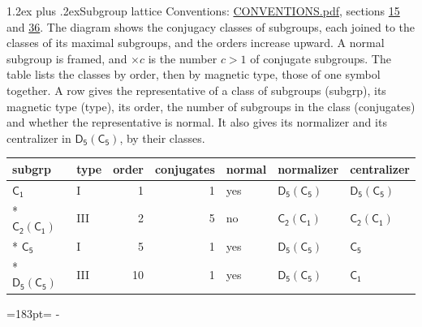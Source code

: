 \documentclass[10pt,a4paper]{article}
\makeatletter
\renewcommand\section{\@startsection{section}{1}{\z@}{-3ex plus -1ex minus -.2ex}%
  {1.2ex plus .2ex}{\normalfont\large\sffamily\bfseries\color{parttitle}}}
\newcommand{\needspace}[1]{\par\penalty-100\begingroup\dimen0=#1\relax\dimen2=\pagegoal
  \advance\dimen2-\pagetotal\ifdim\dimen0>\dimen2\relax\ifdim\dimen2>0pt\vfil\break\fi\fi
  \endgroup}
\numberwithin{equation}{section}
\newcommand{\grp}[1]{\mathsf{#1}}
\newcommand{\nconj}[1]{{\scriptsize$\times#1$}}
\makeatother
\begin{document}
\section{Subgroup lattice}\label{s:subgroups}
Conventions: \href{../../CONVENTIONS.pdf}{CONVENTIONS.pdf}, sections \href{../../../rotation/CONVENTIONS.pdf\#conv.15}{15} and \href{../../CONVENTIONS.pdf\#conv.36}{36}.
The diagram shows the conjugacy classes of subgroups, each joined to the classes of its maximal subgroups, and the orders increase upward. \label{n:index.conjugates.c}\label{n:mark.conjugates}A normal subgroup is framed, and ${\times}c$ is the number $c > 1$ of conjugate subgroups. The table lists the classes by order, then by magnetic type, those of one symbol together. \label{n:head.subgroup}\label{n:head.magnetic.type}\label{n:head.order}\label{n:head.conjugates}\label{n:head.normal}A row gives the representative of a class of subgroups (subgrp), its magnetic type (type), its order, the number of subgroups in the class (conjugates) and whether the representative is normal. \label{n:head.normalizer}\label{n:head.centralizer}It also gives its normalizer and its centralizer in $\grp{D_{5}}(\grp{C_{5}})$, by their classes. 
\begin{center}
\end{center}
{\small\begin{longtable}{@{}llrrlll@{}}\toprule
subgrp & type & order & conjugates & normal & normalizer & centralizer\\\midrule\endhead
\bottomrule\endfoot\endlastfoot
\href{../../../rotation/data/pdf/C1.pdf}{$\grp{C_{1}}$} & I & 1 & 1 & yes & \href{D5-C5.pdf}{$\grp{D_{5}}(\grp{C_{5}})$} & \href{D5-C5.pdf}{$\grp{D_{5}}(\grp{C_{5}})$}\\*
\href{C2-C1.pdf}{$\grp{C_{2}}(\grp{C_{1}})$} & III & 2 & 5 & no & \href{C2-C1.pdf}{$\grp{C_{2}}(\grp{C_{1}})$} & \href{C2-C1.pdf}{$\grp{C_{2}}(\grp{C_{1}})$}\\*
\href{../../../rotation/data/pdf/C5.pdf}{$\grp{C_{5}}$} & I & 5 & 1 & yes & \href{D5-C5.pdf}{$\grp{D_{5}}(\grp{C_{5}})$} & \href{../../../rotation/data/pdf/C5.pdf}{$\grp{C_{5}}$}\\*
\href{D5-C5.pdf}{$\grp{D_{5}}(\grp{C_{5}})$} & III & 10 & 1 & yes & \href{D5-C5.pdf}{$\grp{D_{5}}(\grp{C_{5}})$} & \href{../../../rotation/data/pdf/C1.pdf}{$\grp{C_{1}}$}\\
\bottomrule\end{longtable}}
\needspace{183pt}
\end{document}
